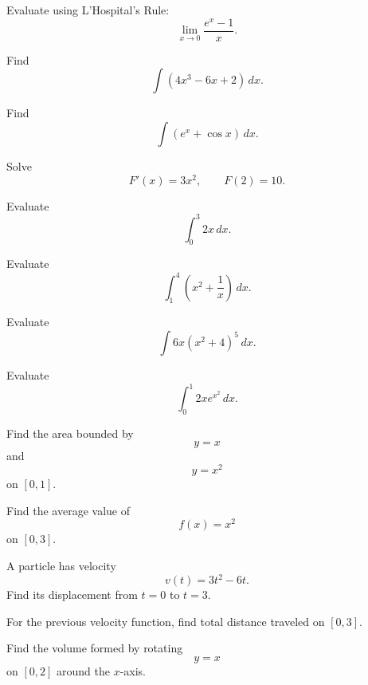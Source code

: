 \begin{exercise}[2]
Evaluate using L'Hospital's Rule:
\[ \lim_{x\to0}\frac{e^x-1}{x}. \]
\end{exercise}

\begin{exercise}[1]
Find
\[ \int(4x^3-6x+2)\,dx. \]
\end{exercise}

\begin{exercise}[1]
Find
\[ \int\left(e^x+\cos x\right)\,dx. \]
\end{exercise}

\begin{exercise}[2]
Solve
\[ F'(x)=3x^2,\qquad F(2)=10. \]
\end{exercise}

\begin{exercise}[1]
Evaluate
\[ \int_0^3 2x\,dx. \]
\end{exercise}

\begin{exercise}[2]
Evaluate
\[ \int_1^4\left(x^2+\frac1x\right)\,dx. \]
\end{exercise}

\begin{exercise}[2]
Evaluate
\[ \int 6x(x^2+4)^5\,dx. \]
\end{exercise}

\begin{exercise}[2]
Evaluate
\[ \int_0^1 2xe^{x^2}\,dx. \]
\end{exercise}

\begin{exercise}[2]
Find the area bounded by
\[ y=x \]
and
\[ y=x^2 \]
on \([0,1]\).
\end{exercise}

\begin{exercise}[2]
Find the average value of
\[ f(x)=x^2 \]
on \([0,3]\).
\end{exercise}

\begin{exercise}[2]
A particle has velocity
\[ v(t)=3t^2-6t. \]
Find its displacement from \(t=0\) to \(t=3\).
\end{exercise}

\begin{exercise}[2]
For the previous velocity function, find total distance traveled on
\([0,3]\).
\end{exercise}

\begin{exercise}[2]
Find the volume formed by rotating
\[ y=x \]
on \([0,2]\) around the \(x\)-axis.
\end{exercise}

